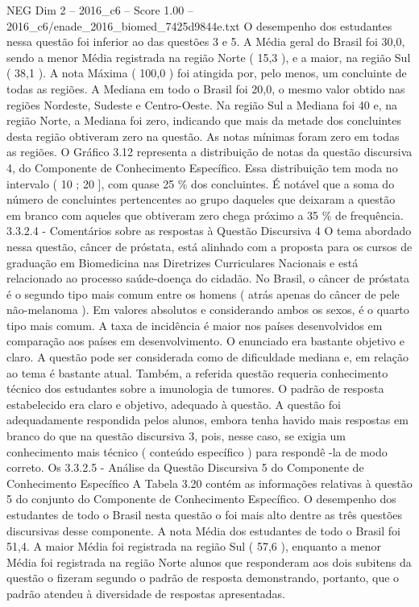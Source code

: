 \begin{textsample}{NEG Dim 2 – 2016\_c6 – Score 1.00 – 2016\_c6/enade\_2016\_biomed\_7425d9844e.txt}
O desempenho dos estudantes nessa questão foi inferior ao das questões 3 e 5.
A Média geral do Brasil foi 30,0, sendo a menor Média registrada na região Norte ( 15,3 ), e a maior, na região Sul ( 38,1 ).
A nota Máxima ( 100,0 ) foi atingida por, pelo menos, um concluinte de todas as regiões.
A Mediana em todo o Brasil foi 20,0, o mesmo valor obtido nas regiões Nordeste, Sudeste e Centro-Oeste.
Na região Sul a Mediana foi 40 e, na região Norte, a Mediana foi zero, indicando que mais da metade dos concluintes desta região obtiveram zero na questão.
As notas mínimas foram zero em todas as regiões.
O Gráfico 3.12 representa a distribuição de notas da questão discursiva 4, do Componente de Conhecimento Específico.
Essa distribuição tem moda no intervalo ( 10 ; 20 ], com quase 25 \% dos concluintes.
É notável que a soma do número de concluintes pertencentes ao grupo daqueles que deixaram a questão em branco com aqueles que obtiveram zero chega próximo a 35 \% de frequência. 3.3.2.4 - Comentários sobre as respostas à Questão Discursiva 4 O tema abordado nessa questão, câncer de próstata, está alinhado com a proposta para os cursos de graduação em Biomedicina nas Diretrizes Curriculares Nacionais e está relacionado ao processo saúde-doença do cidadão.
No Brasil, o câncer de próstata é o segundo tipo mais comum entre os homens ( atrás apenas do câncer de pele não-melanoma ).
Em valores absolutos e considerando ambos os sexos, é o quarto tipo mais comum.
A taxa de incidência é maior nos países desenvolvidos em comparação aos países em desenvolvimento.
O enunciado era bastante objetivo e claro.
A questão pode ser considerada como de dificuldade mediana e, em relação ao tema é bastante atual.
Também, a referida questão requeria conhecimento técnico dos estudantes sobre a imunologia de tumores.
O padrão de resposta estabelecido era claro e objetivo, adequado à questão.
A questão foi adequadamente respondida pelos alunos, embora tenha havido mais respostas em branco do que na questão discursiva 3, pois, nesse caso, se exigia um conhecimento mais técnico ( conteúdo específico ) para respondê -la de modo correto.
Os 3.3.2.5 - Análise da Questão Discursiva 5 do Componente de Conhecimento Específico A Tabela 3.20 contém as informações relativas à questão 5 do conjunto do Componente de Conhecimento Específico.
O desempenho dos estudantes de todo o Brasil nesta questão o foi mais alto dentre as três questões discursivas desse componente.
A nota Média dos estudantes de todo o Brasil foi 51,4.
A maior Média foi registrada na região Sul ( 57,6 ), enquanto a menor Média foi registrada na região Norte alunos que responderam aos dois subitens da questão o fizeram segundo o padrão de resposta demonstrando, portanto, que o padrão atendeu à diversidade de respostas apresentadas.

\end{textsample}
